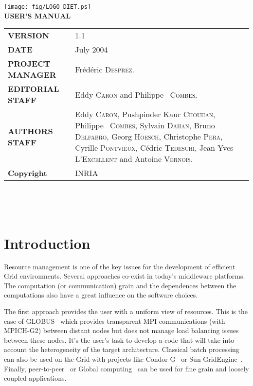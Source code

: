 \documentclass[12pt,a4paper]{book}
\newcommand{\dietversion}{1.1}
\begin{document}

\thispagestyle{empty}
\vspace*{3cm}
\vspace*{3cm}

\begin{center}
\texttt{[image: fig/LOGO\_DIET.ps]}\\[2ex]
\textbf{\Huge USER'S MANUAL\\[2ex]}
\end{center}

\vfill

\noindent
\small{
\begin{tabular}{ll}
  \textbf{VERSION}  & \dietversion\\
  \textbf{DATE}     & July 2004\\
  \textbf{PROJECT MANAGER}  & Fr\'ed\'eric \textsc{Desprez}.\\
  \textbf{EDITORIAL STAFF}  & Eddy \textsc{Caron} and Philippe ~\textsc{Combes}.\\
  \textbf{AUTHORS STAFF}    & 
\begin{minipage}[t]{12cm}
  Eddy \textsc{Caron}, Pushpinder Kaur \textsc{Chouhan}, Philippe ~\textsc{Combes},
  Sylvain \textsc{Dahan}, Bruno \textsc{Delfabro}, Georg \textsc{Hoesch}, Christophe \textsc{Pera}, Cyrille \textsc{Pontvieux}, C\'edric \textsc{Tedeschi}, Jean-Yves \textsc{L'Excellent} and Antoine \textsc{Vernois}.
\end{minipage} \\
  \textbf{Copyright}& INRIA
\end{tabular}\\
}

\newpage
\thispagestyle{empty}
\ 



\newpage
\tableofcontents


%
%
\newpage
{}
\chapter*{Introduction}

Resource management is one of the key issues for the development of efficient Grid environments. Several approaches co-exist in today's middleware platforms. The computation (or communication) grain and the dependences between the computations also have a great influence on the software choices.

The first approach provides the user with a uniform view of resources. This is the case of GLOBUS~\cite{Globus} which provides transparent MPI communications (with MPICH-G2) between distant nodes but does not manage load balancing issues between these nodes. It's the user's task to develop a code that will take into account the heterogeneity of the target architecture. Classical batch processing can also be used on the Grid with projects like Condor-G~\cite{Condor} or Sun GridEngine~\cite{SunGridEngine}. Finally, peer-to-peer~\cite{Oram01} or Global computing~\cite{germain01global} can be used for fine grain and loosely coupled applications.
\end{document}
